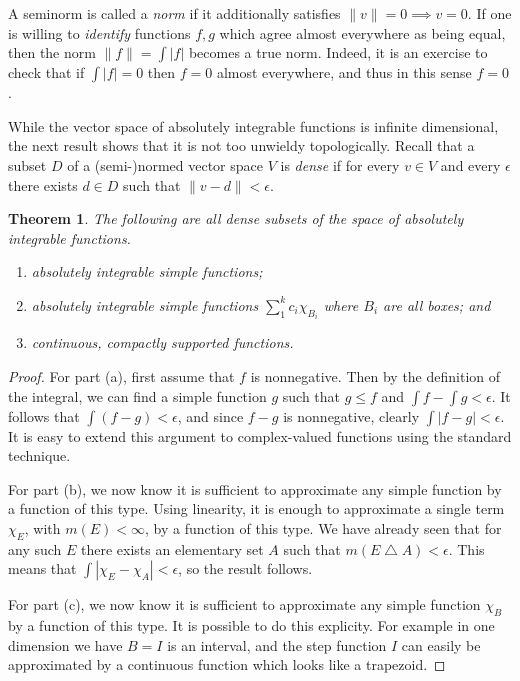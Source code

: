 \documentclass[11pt,oneside]{amsbook}
\renewcommand{\triangle}{\bigtriangleup}
\theoremstyle{definition}
\theoremstyle{plain}
\newtheorem{thm}{Theorem}[section]
\theoremstyle{definition}
\theoremstyle{remark}
\numberwithin{equation}{section}
\numberwithin{figure}{section}
\begin{document}
A seminorm is called a \emph{norm} if it additionally satisfies $\|v\|=0\implies v=0$. If one is willing to \emph{identify} functions $f,g$ which agree almost everywhere as being equal, then the norm $\|f\|=\int|f|$ becomes a true norm. Indeed, it is an exercise to check that if $\int|f|=0$ then $f=0$ almost everywhere, and thus in this sense $f=0$.

While the vector space of absolutely integrable functions is infinite dimensional, the next result shows that it is not too unwieldy topologically. Recall that a subset $D$ of a (semi-)normed vector space $V$ is \emph{dense} if for every $v\in V$ and every $\epsilon$ there exists $d\in D$ such that $\|v-d\|<\epsilon$.

\begin{thm}
  The following are all dense subsets of the space of absolutely integrable functions.
  \begin{enumerate}
  \item absolutely integrable simple functions;
  \item absolutely integrable simple functions $\sum_1^kc_i\chi_{B_i}$ where $B_i$ are all boxes; and
  \item continuous, compactly supported functions.
  \end{enumerate}
\end{thm}

\begin{proof}
  For part (a), first assume that $f$ is nonnegative. Then by the definition of the integral, we can find a simple function $g$ such that $g\leq f$ and $\int f-\int g<\epsilon$. It follows that $\int(f-g)<\epsilon$, and since $f-g$ is nonnegative, clearly $\int|f-g|<\epsilon$. It is easy to extend this argument to complex-valued functions using the standard technique.

  For part (b), we now know it is sufficient to approximate any simple function by a function of this type. Using linearity, it is enough to approximate a single term $\chi_E$, with $m(E)<\infty$, by a function of this type. We have already seen that for any such $E$ there exists an elementary set $A$ such that $m(E\triangle A)<\epsilon$. This means that $\int|\chi_E-\chi_A|<\epsilon$, so the result follows.

  For part (c), we now know it is sufficient to approximate any simple function $\chi_B$ by a function of this type. It is possible to do this explicity. For example in one dimension we have $B=I$ is an interval, and the step function $I$ can easily be approximated by a continuous function which looks like a trapezoid.
\end{proof}
\end{document}
